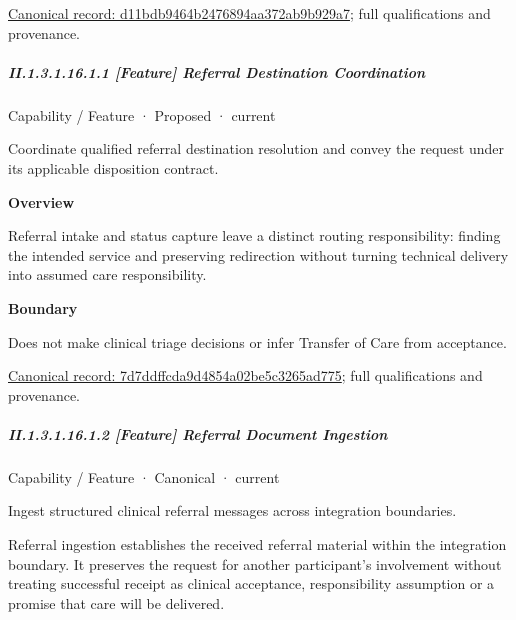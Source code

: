 {\footnotesize \href{../../../../../../../continuum/strategy/capability/d11bdb9464b2476894aa372ab9b929a7.md}{Canonical record: d11bdb9464b2476894aa372ab9b929a7}; full qualifications and provenance.}\par
\subparagraph*{II.1.3.1.16.1.1 [Feature] Referral Destination Coordination}
\label{navigation:II.1.3.1.16.1.1}

\label{element:7d7ddffcda9d4854a02be5c3265ad775}
{\small Capability / Feature · Proposed · current}\par

Coordinate qualified referral destination resolution and convey the request under its applicable disposition contract.



\textbf{Overview}



Referral intake and status capture leave a distinct routing responsibility: finding the intended service and preserving redirection without turning technical delivery into assumed care responsibility.



\textbf{Boundary}



Does not make clinical triage decisions or infer Transfer of Care from acceptance.


{\footnotesize \href{../../../../../../../continuum/strategy/capability/feature/7d7ddffcda9d4854a02be5c3265ad775.md}{Canonical record: 7d7ddffcda9d4854a02be5c3265ad775}; full qualifications and provenance.}\par
\subparagraph*{II.1.3.1.16.1.2 [Feature] Referral Document Ingestion}
\label{navigation:II.1.3.1.16.1.2}

\label{element:1d1c5f8e8ca1498fb68dba601a7079dc}
{\small Capability / Feature · Canonical · current}\par

Ingest structured clinical referral messages across integration boundaries.



Referral ingestion establishes the received referral material within the integration boundary. It preserves the request for another participant's involvement without treating successful receipt as clinical acceptance, responsibility assumption or a promise that care will be delivered.


